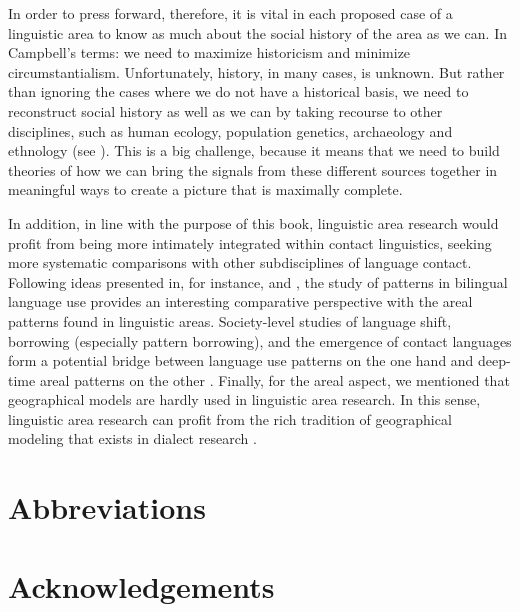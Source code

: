 \documentclass[output=paper,
modfonts
]{langscibook}
\begin{document}
In order to press forward, therefore, it is vital in each proposed case of a linguistic area to know as much about the social history of the area as we can. In Campbell's \parencite*{campbell1985} terms: we need to maximize historicism and minimize circumstantialism. Unfortunately, history, in many cases, is unknown. But rather than ignoring the cases where we do not have a historical basis, we need to reconstruct social history as well as we can by taking recourse to other disciplines, such as human ecology, population genetics, archaeology and ethnology (see \citealt{GijnForthcSeparating}). This is a big challenge, because it means that we need to build theories of how we can bring the signals from these different sources together in meaningful ways to create a picture that is maximally complete.

In addition, in line with the purpose of this book, linguistic area research would profit from being more intimately integrated within contact linguistics, seeking more systematic comparisons with other subdisciplines of language contact. Following ideas presented in, for instance, \cite{niedzielski_linguistic_1996} and \cite{muysken2013language}, the study of patterns in bilingual language use 
provides an interesting comparative perspective with the areal patterns found in linguistic areas. Society-level studies of language shift,
borrowing (especially pattern borrowing), and the emergence of contact languages
form a potential bridge between language use patterns on the one hand and deep-time areal patterns on the other \parencite[see][]{muysken2008conceptual}. Finally, for the areal aspect, we mentioned that geographical models are hardly used in linguistic area research. In this sense, linguistic area research can profit from the rich tradition of geographical modeling that exists in dialect research
.


\section*{Abbreviations}
\section*{Acknowledgements}

\printbibliography[heading=subbibliography,notkeyword=this]
\end{document}
